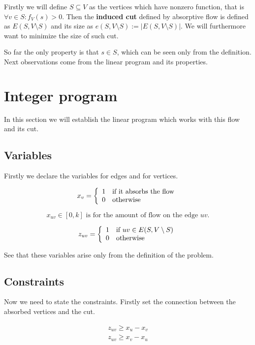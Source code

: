 \documentclass{article}
\begin{document}
	Firstly we will define $S \subseteq V$ as the vertices which have nonzero function, that is $\forall v \in S : f_V(s) > 0$. Then the \textbf{induced cut} defined by absorptive flow is defined as $E(S, V \setminus S)$ and its size as $e(S, V \setminus S) := |E(S, V \setminus S)|$. We will furthermore want to minimize the size of such cut.
	
	So far the only property is that $s \in S$, which can be seen only from the definition. Next observations come from the linear program and its properties.
	
	
	\section{Integer program}
	
	In this section we will establish the linear program which works with this flow and its cut.
	
	\subsection{Variables}
	
	Firstly we declare the variables for edges and for vertices.
	
	$$
	x_v = \left\{\begin{array}{l l}
		1 & \text{if it absorbs the flow} \\
		0 & \text{otherwise}
	\end{array}
	\right.
	$$
	
	$$
	x_{uv} \in [0,k] \text{ is for the amount of flow on the edge } uv.
	$$
	
	$$
	z_{uv} = \left\{\begin{array}{l l}
		1 & \text{if } uv \in E(S, V \setminus S)\\
		0 & \text{otherwise}
	\end{array}
	\right.
	$$
	
	See that these variables arise only from the definition of the problem.
	
	\subsection{Constraints}
	
	Now we need to state the constraints. Firstly set the connection between the absorbed vertices and the cut.
	
	$$
	\begin{array}{c}
		z_{uv} \geq x_u - x_v \\
		z_{uv} \geq x_v - x_u
	\end{array}
	$$
	
\end{document}
